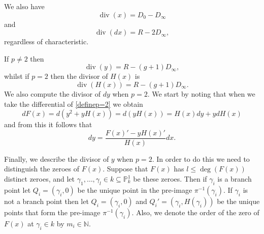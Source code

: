 \documentclass[draft, 11pt]{article} %
\theoremstyle{plain}
\theoremstyle{remark}
\newcommand{\NN}{{\mathbb N}}
\DeclareMathOperator{\di}{div}
\begin{document}
We also have
\begin{equation}\label{divxp=2}
\di (x)  = D_0 - D_\infty
\end{equation}
and
\begin{equation}\label{differentialdivisor}
\di(dx) = R - 2D_\infty,
\end{equation}
regardless of characteristic.

If $p \neq 2$ then 
\begin{equation}\label{pnot2divisors}
\di(y)  = R - (g+1)D_\infty,
\end{equation}
whilst if $p=2$ then the divisor of $H(x)$ is
\begin{equation}\label{divisorofH}
\di (H(x))  = R - (g+1)D_\infty. 
\end{equation}
We also compute the divisor of $dy$ when $p=2$.
We start by noting that when we take the differential of \eqref{definep=2} we obtain
\[
dF(x) = d\left(y^2 + yH(x) \right) = d(yH(x)) = H(x)dy + ydH(x)
\]
and from this it follows that
\begin{equation}\label{divdyp=2}
dy = \frac{F(x)'-yH(x)'}{H(x)}dx.
\end{equation}

Finally, we describe the divisor of $y$ when $p=2$.
In order to do this we need to distinguish the zeroes of $F(x)$.
Suppose that $F(x)$ has $l \leq \deg(F(x))$ distinct zeroes, and let $\gamma_1, \ldots, \gamma_l \in k \subseteq \mathbb P_k^1$ be these zeroes.
Then if $\gamma_i$ is a branch point let $Q_i = (\gamma_i, 0)$ be the unique point in the pre-image $\pi^{-1}(\gamma_i)$.
If $\gamma_i$ is not a branch point then let $Q_i = (\gamma_i, 0)$ and $Q_i' = (\gamma_i, H(\gamma_i))$ be the unique points that form the pre-image $\pi^{-1}(\gamma_i)$.
Also, we denote the order of the zero of $F(x)$ at $\gamma_i \in k$ by $m_i \in \NN$.
\end{document}
